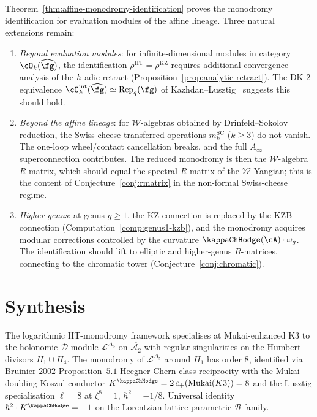 \begin{remark}
\label{rem:affine-scope}
Theorem~\ref{thm:affine-monodromy-identification} proves the monodromy identification for evaluation modules of the affine lineage. Three natural extensions remain:
\begin{enumerate}[label=\textup{(\alph*)}]
 \item \emph{Beyond evaluation modules}: for infinite-dimensional modules in category $\cO_k(\widehat{\fg})$, the identification $\rho^{\mathrm{HT}} = \rho^{\mathrm{KZ}}$ requires additional convergence analysis of the $\hbar$-adic retract (Proposition~\ref{prop:analytic-retract}). The DK-2 equivalence $\cO_k^{\mathrm{int}}(\widehat{\fg}) \simeq \mathrm{Rep}_q(\fg)$ of Kazhdan--Lusztig~\cite{KL93} suggests this should hold.
 \item \emph{Beyond the affine lineage}: for $\mathcal{W}$-algebras obtained by Drinfeld--Sokolov reduction, the Swiss-cheese transferred operations $m_k^{\mathrm{SC}}$ ($k \geq 3$) do not vanish. The one-loop wheel/contact cancellation breaks, and the full $A_\infty$ superconnection contributes. The reduced monodromy is then the $\mathcal{W}$-algebra $R$-matrix, which should equal the spectral $R$-matrix of the $\mathcal{W}$-Yangian; this is the content of Conjecture~\ref{conj:rmatrix} in the non-formal Swiss-cheese regime.
 \item \emph{Higher genus}: at genus $g \geq 1$, the KZ connection is replaced by the KZB connection (Computation~\ref{comp:genus1-kzb}), and the monodromy acquires modular corrections controlled by the curvature $\kappaChHodge(\cA) \cdot \omega_g$. The identification should lift to elliptic and higher-genus $R$-matrices, connecting to the chromatic tower (Conjecture~\ref{conj:chromatic}).
\end{enumerate}
\end{remark}


\section{Synthesis}
\label{sec:loght-core-supplement}

\begin{remark}
\label{rem:loght-core-humbert}
The logarithmic HT-monodromy framework specialises at Mukai-enhanced K3 to the holonomic $\mathcal{D}$-module $\mathcal{L}^{\Delta_5}$ on $\overline{\mathcal{A}_2}$ with regular singularities on the Humbert divisors $H_1 \cup H_4$. The monodromy of $\mathcal{L}^{\Delta_5}$ around $H_1$ has order $8$, identified via Bruinier $2002$ Proposition~$5.1$ Heegner Chern-class reciprocity with the Mukai-doubling Koszul conductor $K^{\kappaChHodge} = 2\,c_+(\mathrm{Mukai}(K3)) = 8$ and the Lusztig specialisation $\ell = 8$ at $\zeta^8 = 1$, $\hbar^2 = -1/8$. Universal identity $\hbar^2 \cdot K^{\kappaChHodge} = -1$ on the Lorentzian-lattice-parametric $\mathcal{B}$-family.
\end{remark}
